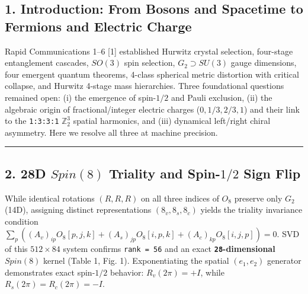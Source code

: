 \documentclass[
  a4paper,
]{article}
\begin{document}
\subsection{1. Introduction: From Bosons and Spacetime to Fermions and
Electric
Charge}\label{introduction-from-bosons-and-spacetime-to-fermions-and-electric-charge}

Rapid Communications 1--6 {[}1{]} established Hurwitz crystal selection,
four-stage entanglement cascades, \(SO(3)\) spin selection,
\(G_2 \supset SU(3)\) gauge dimensions, four emergent quantum theorems,
4-class spherical metric distortion with critical collapse, and Hurwitz
4-stage mass hierarchies. Three foundational questions remained open:
(i) the emergence of spin-\(1/2\) and Pauli exclusion, (ii) the
algebraic origin of fractional/integer electric charges
(\(0, 1/3, 2/3, 1\)) and their link to the \texttt{1:3:3:1}
\(\mathbb{Z}_2^3\) spatial harmonics, and (iii) dynamical left/right
chiral asymmetry. Here we resolve all three at machine precision.

\begin{center}\rule{0.5\linewidth}{0.5pt}\end{center}

\subsection{\texorpdfstring{2. 28D \(Spin(8)\) Triality and Spin-\(1/2\)
Sign
Flip}{2. 28D Spin(8) Triality and Spin-1/2 Sign Flip}}\label{d-spin8-triality-and-spin-12-sign-flip}

While identical rotations \((R, R, R)\) on all three indices of \(O_8\)
preserve only \(G_2\) (14D), assigning distinct representations
\((8_v, 8_s, 8_c)\) yields the triality invariance condition
\(\sum_p ((A_v)_{ip}O_8[p,j,k] + (A_s)_{jp}O_8[i,p,k] + (A_c)_{kp}O_8[i,j,p]) = 0\).
SVD of this \(512 \times 84\) system confirms \texttt{rank\ =\ 56} and
an exact \textbf{\texttt{28}-dimensional} \(Spin(8)\) kernel (Table 1,
Fig. 1). Exponentiating the spatial \((e_1, e_2)\) generator
demonstrates exact spin-\(1/2\) behavior: \(R_v(2\pi) = +I\), while
\(R_s(2\pi) = R_c(2\pi) = -I\).
\end{document}
